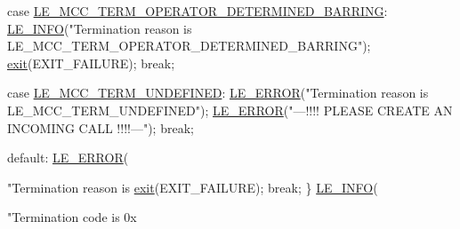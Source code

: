 \begin{DoxyCodeInclude}
{{            \textcolor{keywordflow}{case} \hyperlink{le__mcc__interface_8h_abda706f723ba619f9bc460bcc9a4960da4f91eb4e6eec8ed84c3b4b6d1ab949fd}{LE\_MCC\_TERM\_OPERATOR\_DETERMINED\_BARRING}:
                \hyperlink{le__log_8h_a23e6d206faa64f612045d688cdde5808}{LE\_INFO}(\textcolor{stringliteral}{"Termination reason is LE\_MCC\_TERM\_OPERATOR\_DETERMINED\_BARRING"});
                \hyperlink{app_stop_client_8c_a310220604a584e112ba8f7aa3dfe23f1}{exit}(EXIT\_FAILURE);
                \textcolor{keywordflow}{break};

            \textcolor{keywordflow}{case} \hyperlink{le__mcc__interface_8h_abda706f723ba619f9bc460bcc9a4960da3dbb90bf0628971a6afbd4773fc97c1a}{LE\_MCC\_TERM\_UNDEFINED}:
                \hyperlink{le__log_8h_a353590f91b3143a7ba3a416ae5a50c3d}{LE\_ERROR}(\textcolor{stringliteral}{"Termination reason is LE\_MCC\_TERM\_UNDEFINED"});
                \hyperlink{le__log_8h_a353590f91b3143a7ba3a416ae5a50c3d}{LE\_ERROR}(\textcolor{stringliteral}{"---!!!! PLEASE CREATE AN INCOMING CALL !!!!---"});
                \textcolor{keywordflow}{break};

            \textcolor{keywordflow}{default}:
                \hyperlink{le__log_8h_a353590f91b3143a7ba3a416ae5a50c3d}{LE\_ERROR}(\textcolor{stringliteral}{"Termination reason is %
                \hyperlink{app_stop_client_8c_a310220604a584e112ba8f7aa3dfe23f1}{exit}(EXIT\_FAILURE);
                \textcolor{keywordflow}{break};
        \}
        \hyperlink{le__log_8h_a23e6d206faa64f612045d688cdde5808}{LE\_INFO}(\textcolor{stringliteral}{"Termination code is 0x%

}}}}
\end{DoxyCodeInclude}

